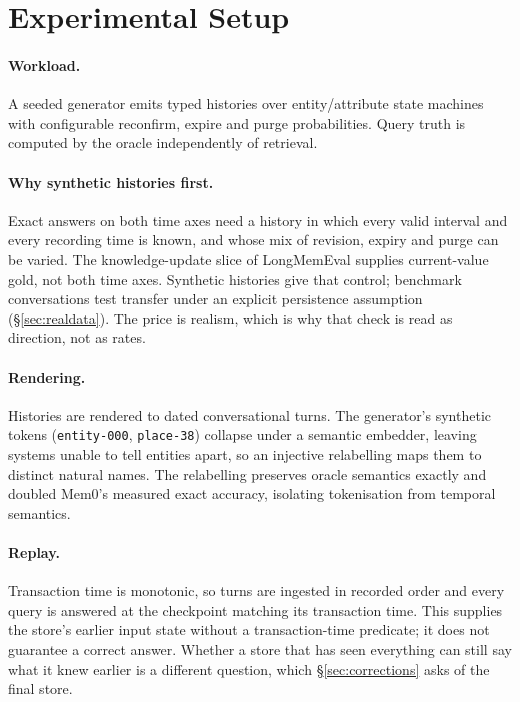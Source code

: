 \documentclass[conference]{IEEEtran}
\begin{document}
\section{Experimental Setup}\label{sec:setup}

\paragraph{Workload.} A seeded generator emits typed histories over
entity/attribute state machines with configurable reconfirm, expire and purge
probabilities. Query truth is computed by the oracle independently of retrieval.

\paragraph{Why synthetic histories first.} Exact answers on both time axes need
a history in which every valid interval and every recording time is known, and
whose mix of revision, expiry and purge can be varied. The knowledge-update
slice of LongMemEval supplies current-value gold, not both time axes. Synthetic
histories give that control; benchmark conversations test transfer under an
explicit persistence assumption (\S\ref{sec:realdata}).
The price is realism, which is why that check is read as direction, not as
rates.

\paragraph{Rendering.} Histories are rendered to dated conversational turns.
The generator's synthetic tokens (\texttt{entity-000}, \texttt{place-38})
collapse under a semantic embedder, leaving systems unable to tell entities
apart, so an injective relabelling maps them to distinct natural names. The
relabelling preserves oracle semantics exactly and doubled Mem0's measured exact
accuracy, isolating tokenisation from temporal semantics.

\paragraph{Replay.} Transaction time is monotonic, so turns are ingested in
recorded order and every query is answered at the checkpoint matching its
transaction time. This supplies the store's earlier input state without a
transaction-time predicate; it does not guarantee a correct answer. Whether a store
that has seen everything can still say what it knew earlier is a different
question, which \S\ref{sec:corrections} asks of the final store.
\end{document}
